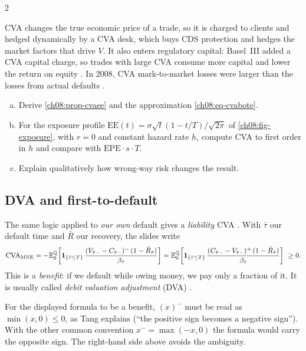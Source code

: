 \begin{paracol}{2}
\begin{finance}
CVA changes the true economic price of a trade, so it is charged to clients and hedged dynamically by a CVA
desk, which buys CDS protection and hedges the market factors that drive $V$. It also enters regulatory capital:
Basel~III added a CVA capital charge, so trades with large CVA consume more capital and lower the return on
equity . In 2008, CVA mark-to-market losses were larger than the losses from actual defaults
.
\end{finance}

\begin{exercise}
\leavevmode
\begin{enumerate}[(a)]
  \item Derive \cref{ch08:prop-cvaee} and the approximation \eqref{ch08:eq-cvabote}.
  \item For the exposure profile
      $\mathrm{EE}(t)=\sigma\sqrt t(1-t/T)/\sqrt{2\pi}$ of \cref{ch08:fig-exposure}, with $r=0$ and constant hazard rate $h$,
      compute CVA to first order in $h$ and compare with $\mathrm{EPE}\cdot s\cdot T$.
  \item Explain qualitatively how wrong-way
      risk changes the result.
\end{enumerate}
\end{exercise}

\subsection{DVA and first-to-default}
The same logic applied to \emph{our own} default gives a \emph{liability} CVA . With $\bar\tau$
our default time and $\bar R$ our recovery, the slides write
\[
  \mathrm{CVA}_{\mathrm{MNE}} = -\mathbb{E}_0^{\mathbb{Q}}\!\left[\mathbf{1}_{\{\bar\tau\le T\}}\,
      \frac{(V_{\bar\tau-}-C_{\bar\tau-})^-\,(1-\bar R_{\bar\tau})}{\beta_{\bar\tau}}\right]
  = \mathbb{E}_0^{\mathbb{Q}}\!\left[\mathbf{1}_{\{\bar\tau\le T\}}\,
      \frac{(C_{\bar\tau-}-V_{\bar\tau-})^+\,(1-\bar R_{\bar\tau})}{\beta_{\bar\tau}}\right]\ \ge 0 .
\]
This is a \emph{benefit}: if we default while owing money, we pay only a fraction of it. It is usually called
\emph{debit valuation adjustment} (DVA) .

\begin{coursenote}
For the displayed formula to be a benefit, $(x)^-$ must be read as $\min(x,0)\le0$, as Tang explains
(``the positive sign becomes a negative sign''). With the other common convention $x^-=\max(-x,0)$ the
formula would carry the opposite sign. The right-hand side above avoids the ambiguity.
\end{coursenote}


\end{paracol}
